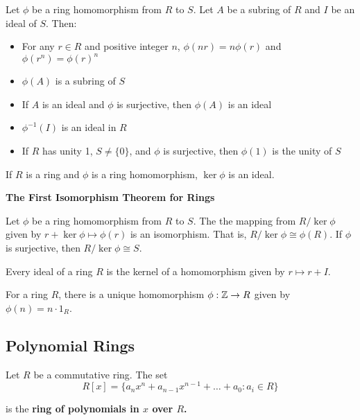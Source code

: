 \documentclass{hmwk}
\begin{document}
\begin{prop}
Let $\phi$ be a ring homomorphism from $R$ to $S$. Let $A$ be a subring of $R$ and $I$ be an ideal of $S$. Then:
\begin{itemize}
    \item For any $r \in R$ and positive integer $n$, $\phi(nr) = n\phi(r)$ and $\phi(r^n) = \phi(r)^n$
    \item $\phi(A)$ is a subring of $S$
    \item If $A$ is an ideal and $\phi$ is surjective, then $\phi(A)$ is an ideal
    \item $\phi^{-1}(I)$ is an ideal in $R$
    \item If $R$ has unity 1, $S \neq \{0\}$, and $\phi$ is surjective, then $\phi(1)$ is the unity of $S$
\end{itemize}
\end{prop}

\begin{prop}
If $R$ is a ring and $\phi$ is a ring homomorphism, $\ker\phi$ is an ideal.
\end{prop}

\begin{important}
\bf{The First Isomorphism Theorem for Rings}

Let $\phi$ be a ring homomorphism from $R$ to $S$. The the mapping from $R/\ker\phi$ given by $r + \ker\phi \mapsto \phi(r)$ is an isomorphism. That is, $R/\ker\phi \cong \phi(R)$. If $\phi$ is surjective, then $R/\ker\phi \cong S$.
\end{important}

\begin{prop}
Every ideal of a ring $R$ is the kernel of a homomorphism given by $r \mapsto r + I$.
\end{prop}

\begin{prop}
For a ring $R$, there is a unique homomorphism $\phi: \mathbb{Z} \rightarrow R$ given by $\phi(n) = n \cdot 1_R$.
\end{prop}

\subsection{Polynomial Rings}

\begin{defn}
Let $R$ be a commutative ring. The set $$R[x] = \{a_nx^n + a_{n-1}x^{n-1} + \dots + a_0 : a_i \in R\}$$

is the \bf{ring of polynomials} in $x$ over $R$.
\end{defn}
\end{document}
